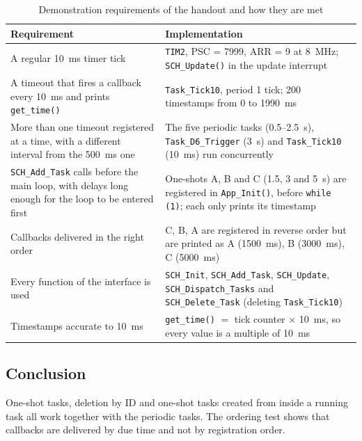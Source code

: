 \documentclass[twoside,final]{hcmut-report}
\begin{document}
\begin{table}[H]
    \centering
    \caption{Demonstration requirements of the handout and how they are met}
    \label{tab:demo}
    \begin{tabular}{p{}p{}}
        \toprule
        \textbf{Requirement} & \textbf{Implementation} \\
        \midrule
        A regular 10~ms timer tick & \texttt{TIM2}, PSC = 7999, ARR = 9 at 8~MHz; \texttt{SCH\_Update()} in the update interrupt \\
        A timeout that fires a callback every 10~ms and prints \texttt{get\_time()} & \texttt{Task\_Tick10}, period 1 tick; 200 timestamps from 0 to 1990~ms \\
        More than one timeout registered at a time, with a different interval from the 500~ms one & The five periodic tasks (0.5--2.5~s), \texttt{Task\_D6\_Trigger} (3~s) and \texttt{Task\_Tick10} (10~ms) run concurrently \\
        \texttt{SCH\_Add\_Task} calls before the main loop, with delays long enough for the loop to be entered first & One-shots A, B and C (1.5, 3 and 5~s) are registered in \texttt{App\_Init()}, before \texttt{while (1)}; each only prints its timestamp \\
        Callbacks delivered in the right order & C, B, A are registered in reverse order but are printed as A (1500~ms), B (3000~ms), C (5000~ms) \\
        Every function of the interface is used & \texttt{SCH\_Init}, \texttt{SCH\_Add\_Task}, \texttt{SCH\_Update}, \texttt{SCH\_Dispatch\_Tasks} and \texttt{SCH\_Delete\_Task} (deleting \texttt{Task\_Tick10}) \\
        Timestamps accurate to 10~ms & \texttt{get\_time()} $=$ tick counter $\times$ 10~ms, so every value is a multiple of 10~ms \\
        \bottomrule
    \end{tabular}
\end{table}

\subsection{Conclusion}
One-shot tasks, deletion by ID and one-shot tasks created from inside a running task all work together with the periodic tasks. The ordering test shows that callbacks are delivered by due time and not by registration order.

\end{document}
